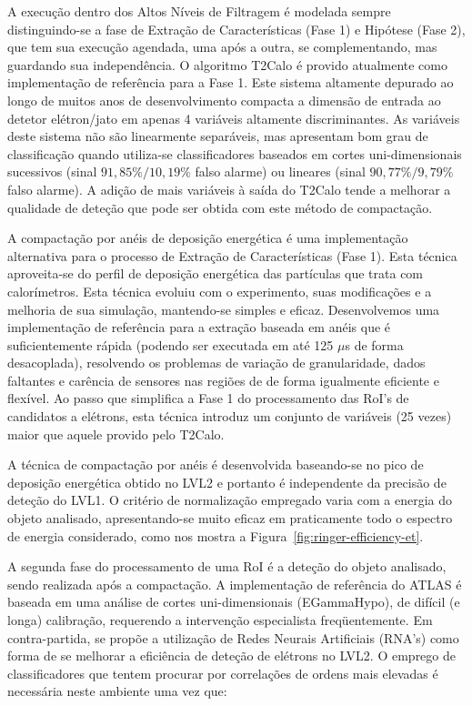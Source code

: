 A execução dentro dos Altos Níveis de Filtragem é modelada sempre
distinguindo-se a fase de Extração de Características (Fase 1) e Hipótese
(Fase 2), que tem sua execução agendada, uma após a outra, se complementando,
mas guardando sua independência. O algoritmo T2Calo é provido atualmente como
implementação de referência para a Fase 1. Este sistema altamente depurado ao
longo de muitos anos de desenvolvimento compacta a dimensão de entrada ao
detetor elétron/jato em apenas 4 variáveis altamente discriminantes. As
variáveis deste sistema não são linearmente separáveis, mas apresentam bom
grau de classificação quando utiliza-se classificadores baseados em cortes
uni-dimensionais sucessivos (sinal $91,85\%/10,19\%$ falso alarme) ou lineares
(sinal $90,77\%/9,79\%$ falso alarme). A adição de mais variáveis à saída do
T2Calo tende a melhorar a qualidade de deteção que pode ser obtida com este
método de compactação.

A compactação por anéis de deposição energética é uma implementação
alternativa para o processo de Extração de Características (Fase 1). Esta
técnica aproveita-se do perfil de deposição energética das partículas que
trata com calorímetros. Esta técnica evoluiu com o experimento, suas
modificações e a melhoria de sua simulação, mantendo-se simples e
eficaz. Desenvolvemos uma implementação de referência para a extração baseada
em anéis que é suficientemente rápida (podendo ser executada em até 125 $\mu$s
de forma desacoplada), resolvendo os problemas de variação de granularidade,
dados faltantes e carência de sensores nas regiões de  de forma
igualmente eficiente e flexível. Ao passo que simplifica a Fase 1 do
processamento das RoI's de candidatos a elétrons, esta técnica introduz um
conjunto de variáveis (25 vezes) maior que aquele provido pelo T2Calo.

A técnica de compactação por anéis é desenvolvida baseando-se no pico de
deposição energética obtido no LVL2 e portanto é independente da precisão de
deteção do LVL1. O critério de normalização empregado varia com a energia do
objeto analisado, apresentando-se muito eficaz em praticamente todo o espectro
de energia considerado, como nos mostra a
Figura~\ref{fig:ringer-efficiency-et}.

A segunda fase do processamento de uma RoI é a deteção do objeto analisado,
sendo realizada após a compactação. A implementação de referência do ATLAS é
baseada em uma análise de cortes uni-dimensionais (EGammaHypo), de difícil (e
longa) calibração, requerendo a intervenção especialista freqüentemente. Em
contra-partida, se propõe a utilização de Redes Neurais Artificiais (RNA's)
como forma de se melhorar a eficiência de deteção de elétrons no LVL2. O
emprego de classificadores que tentem procurar por correlações de ordens mais
elevadas é necessária neste ambiente uma vez que:

